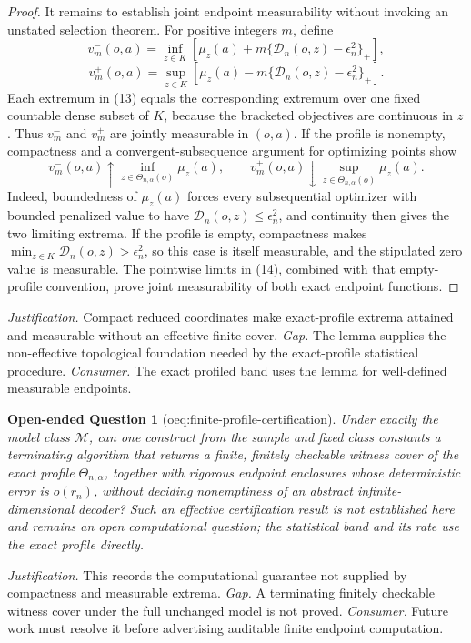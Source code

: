 \documentclass{article}
\newtheorem{openendedquestion}{Open-ended Question}
\begin{document}
\begin{proof}
It remains to establish joint endpoint measurability without invoking an unstated selection theorem.  For positive integers \(m\), define
\[
v_m^-(o,a)=\inf_{z\in K}\left[\mu_z(a)+m\{\mathscr D_n(o,z)-\epsilon_n^2\}_+\right],
\]
\[
v_m^+(o,a)=\sup_{z\in K}\left[\mu_z(a)-m\{\mathscr D_n(o,z)-\epsilon_n^2\}_+\right]. \tag{13}
\]
Each extremum in (13) equals the corresponding extremum over one fixed countable dense subset of \(K\), because the bracketed objectives are continuous in \(z\).  Thus \(v_m^-\) and \(v_m^+\) are jointly measurable in \((o,a)\).  If the profile is nonempty, compactness and a convergent-subsequence argument for optimizing points show
\[
v_m^-(o,a)\uparrow\inf_{z\in\Theta_{n,\alpha}(o)}\mu_z(a),
\qquad
v_m^+(o,a)\downarrow\sup_{z\in\Theta_{n,\alpha}(o)}\mu_z(a). \tag{14}
\]
Indeed, boundedness of \(\mu_z(a)\) forces every subsequential optimizer with bounded penalized value to have \(\mathscr D_n(o,z)\le\epsilon_n^2\), and continuity then gives the two limiting extrema.  If the profile is empty, compactness makes \(\min_{z\in K}\mathscr D_n(o,z)>\epsilon_n^2\), so this case is itself measurable, and the stipulated zero value is measurable.  The pointwise limits in (14), combined with that empty-profile convention, prove joint measurability of both exact endpoint functions.
\end{proof}
\par\smallskip\noindent \textit{Justification.} Compact reduced coordinates make exact-profile extrema attained and measurable without an effective finite cover. \textit{Gap.} The lemma supplies the non-effective topological foundation needed by the exact-profile statistical procedure. \textit{Consumer.} The exact profiled band uses the lemma for well-defined measurable endpoints.

\begin{openendedquestion}[oeq:finite-profile-certification]\label{oeq:finite-profile-certification}
Under exactly the model class \(\mathcal M\), can one construct from the sample and fixed class constants a terminating algorithm that returns a finite, finitely checkable witness cover of the exact profile \(\Theta_{n,\alpha}\), together with rigorous endpoint enclosures whose deterministic error is \(o(r_n)\), without deciding nonemptiness of an abstract infinite-dimensional decoder?  Such an effective certification result is not established here and remains an open computational question; the statistical band and its rate use the exact profile directly.
\end{openendedquestion}
\par\smallskip\noindent \textit{Justification.} This records the computational guarantee not supplied by compactness and measurable extrema. \textit{Gap.} A terminating finitely checkable witness cover under the full unchanged model is not proved. \textit{Consumer.} Future work must resolve it before advertising auditable finite endpoint computation.
\end{document}
